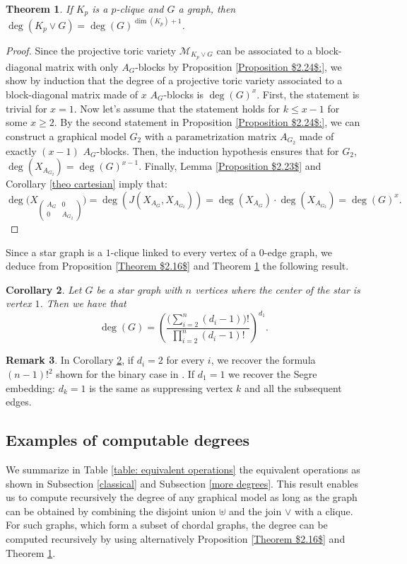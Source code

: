 \documentclass[11pt]{amsart}
\numberwithin{equation}{section}
\theoremstyle{plain}
\newtheorem{theorem}{Theorem}
\numberwithin{theorem}{section}
\newtheorem{corollary}[theorem]{Corollary}
\theoremstyle{definition}
\newtheorem{remark}[theorem]{Remark}
\begin{document}
\begin{theorem}
\label{Theorem $2.26$}
If $K_p$ is a $p$-clique and $G$ a graph, then $\deg(K_p\vee G)=\deg(G)^{\dim(K_p)+1}$.  
\end{theorem}
\begin{proof} Since the projective toric variety $\mathcal M_{K_p\vee G}$ can be associated to a block-diagonal matrix with only $A_G$-blocks by Proposition \ref{Proposition $2.24$:}, we show by induction that the degree of a projective toric variety associated to a block-diagonal matrix made of $x$ $A_G$-blocks is $\deg(G)^x$.
First, the statement is trivial for $x=1$. Now let's assume that the statement holds for $k\le x-1$ for some $x\ge2$. By the second statement in Proposition \ref{Proposition $2.24$:}, we can construct a graphical model $G_2$ with a parametrization matrix $A_{G_2}$ made of exactly $(x-1)$ $A_G$-blocks. Then, the induction hypothesis ensures that for  $G_2$, $\deg(X_{A_{G_2}})=\deg(G)^{x-1}$. Finally, Lemma \ref{Proposition $2.23$} and Corollary \ref{theo cartesian} imply that: $$\deg\bigg(X_{\left(\begin{smallmatrix}
    A_G& 0\\
    0& A_{G_2}
\end{smallmatrix}\right)}\bigg)=\deg\left(J\left(X_{A_G},X_{A_{G_2}}\right)\right)=\deg(X_{A_G})\cdot\deg(X_{A_{G_2}})=\deg(G)^x.$$
\end{proof}


 Since a star graph is a $1$-clique linked to every vertex of a $0$-edge graph, we deduce from Proposition \ref{Theorem $2.16$} and Theorem \ref{Theorem $2.26$} the following result.

\begin{corollary}
    \label{Corollary $2.27$:} Let $G$ be a star graph with $n$ vertices where the center of the star is vertex $1$. Then we have that  $$\deg(G)=\left(\frac{\bigg(\displaystyle\sum_{i=2}^n(d_i-1)\bigg)!}{\displaystyle\prod_{i=2}^n(d_i-1)!}\right)^{d_1}.$$
\end{corollary}

\begin{remark}
    In Corollary \ref{Corollary $2.27$:}, if $d_i=2$ for every $i$, we recover the formula $(n-1)!^2$ shown for the binary case in \cite[Corollary 5.6]{develin2003markov}. If $d_1=1$ we recover the Segre embedding: $d_k=1$ is the same as suppressing vertex $k$ and all the subsequent edges.
\end{remark}

\subsection{Examples of computable degrees} We summarize in Table \ref{table: equivalent operations} the equivalent operations as shown in Subsection \ref{classical} and Subsection \ref{more degrees}. This result enables us to compute recursively the degree of any graphical model as long as the graph can be obtained by combining the disjoint union $\uplus$ and the join $\vee$ with a clique. For such graphs, which form a subset of chordal graphs, the degree can be computed recursively by using alternatively Proposition \ref{Theorem $2.16$} and Theorem \ref{Theorem $2.26$}.
\end{document}
